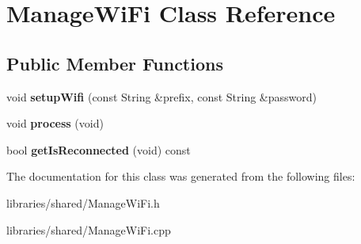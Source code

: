 \hypertarget{class_manage_wi_fi}{}\section{Manage\+Wi\+Fi Class Reference}
\label{class_manage_wi_fi}
\subsection*{Public Member Functions}
\begin{DoxyCompactItemize}
\item 
\mbox{\label{class_manage_wi_fi_aa0d2dab8eb5b012e6d5fa551cd237c18}} 
void {\bfseries setup\+Wifi} (const String \&prefix, const String \&password)
\item 
\mbox{\label{class_manage_wi_fi_aab37b036ce73ebf0a72dd54b0643226b}} 
void {\bfseries process} (void)
\item 
\mbox{\label{class_manage_wi_fi_ab7274a8f46b92649b6d94c5f1884bc99}} 
bool {\bfseries get\+Is\+Reconnected} (void) const
\end{DoxyCompactItemize}


The documentation for this class was generated from the following files\+:\begin{DoxyCompactItemize}
\item 
libraries/shared/Manage\+Wi\+Fi.\+h\item 
libraries/shared/Manage\+Wi\+Fi.\+cpp\end{DoxyCompactItemize}
